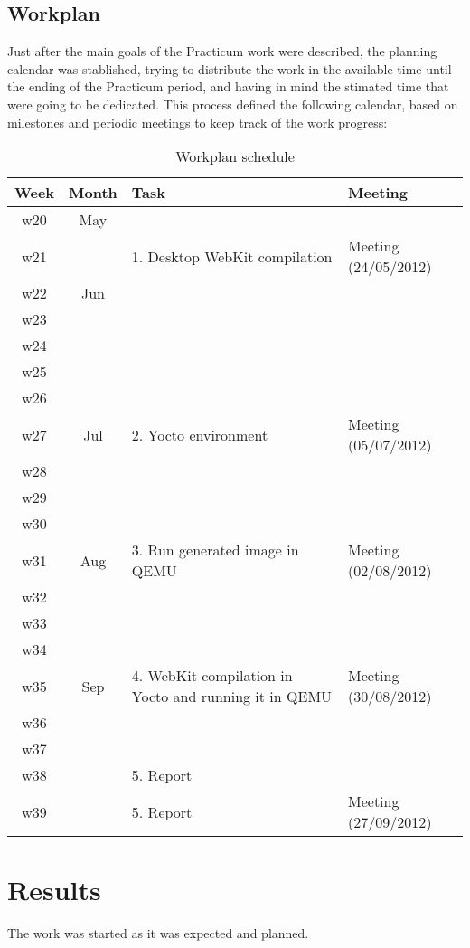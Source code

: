 \documentclass[a4paper,11pt,openany]{report}
\begin{document}
\section{Workplan}
Just after the main goals of the Practicum work were described, the planning calendar was stablished, trying to distribute the work in the available time until the ending of the Practicum period, and having in mind the stimated time that were going to be dedicated.
This process defined the following calendar, based on milestones and periodic meetings to keep track of the work progress:
\\
\begin{table}
\begin{tabularx}{\textwidth}{|c|c|X|X|}
\hline 
Week & Month & Task & Meeting \\ 
\hline 
w20 & May &  &  \\ 
\hline 
w21 &  & 1. Desktop WebKit compilation & Meeting (24/05/2012) \\ 
\hline 
w22 & Jun &  &  \\ 
\hline 
w23 &  &  &  \\ 
\hline 
w24 &  &  &  \\ 
\hline 
w25 &  &  &  \\ 
\hline 
w26 &  &  &  \\ 
\hline 
w27 & Jul & 2. Yocto environment & Meeting (05/07/2012) \\ 
\hline 
w28 &  &  &  \\ 
\hline 
w29 &  &  &  \\ 
\hline 
w30 &  &  &  \\ 
\hline 
w31 & Aug & 3. Run generated image in QEMU & Meeting (02/08/2012) \\ 
\hline 
w32 &  &  &  \\ 
\hline 
w33 &  &  &  \\ 
\hline 
w34 &  &  &  \\ 
\hline 
w35 & Sep & 4. WebKit compilation in Yocto and running it in QEMU & Meeting (30/08/2012) \\ 
\hline 
w36 &  &  &  \\ 
\hline 
w37 &  &  &  \\ 
\hline 
w38 &  & 5. Report &  \\ 
\hline 
w39 &  & 5. Report & Meeting (27/09/2012) \\ 
\hline 
\end{tabularx}
\caption{Workplan schedule}
\end{table}

\chapter{Results}
The work was started as it was expected and planned.
\end{document}

